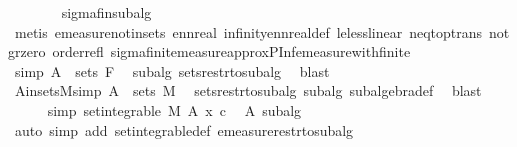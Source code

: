 \begin{isabellebody}
\ \ \ \ \ \ \isamarkupfalse%
\ sigma{\isacharunderscore}{\kern0pt}fin{\isacharunderscore}{\kern0pt}subalg\ \isamarkupfalse%
\ {\isacharparenleft}{\kern0pt}metis\ emeasure{\isacharunderscore}{\kern0pt}notin{\isacharunderscore}{\kern0pt}sets\ ennreal{\isacharunderscore}{\kern0pt}{}\ infinity{\isacharunderscore}{\kern0pt}ennreal{\isacharunderscore}{\kern0pt}def\ le{\isacharunderscore}{\kern0pt}less{\isacharunderscore}{\kern0pt}linear\ neq{\isacharunderscore}{\kern0pt}top{\isacharunderscore}{\kern0pt}trans\ not{\isacharunderscore}{\kern0pt}gr{\isacharunderscore}{\kern0pt}zero\ order{\isacharunderscore}{\kern0pt}refl\ sigma{\isacharunderscore}{\kern0pt}finite{\isacharunderscore}{\kern0pt}measure{\isachardot}{\kern0pt}approx{\isacharunderscore}{\kern0pt}PInf{\isacharunderscore}{\kern0pt}emeasure{\isacharunderscore}{\kern0pt}with{\isacharunderscore}{\kern0pt}finite{\isacharparenright}{\kern0pt}\isanewline
\ \ \ \ \isamarkupfalse%
\ {\isacharbrackleft}{\kern0pt}simp{\isacharbrackright}{\kern0pt}{\isacharcolon}{\kern0pt}\ {\isachardoublequoteopen}A\ {\isasymin}\ sets\ F{\isachardoublequoteclose}\ \isamarkupfalse%
\ subalg\ sets{\isacharunderscore}{\kern0pt}restr{\isacharunderscore}{\kern0pt}to{\isacharunderscore}{\kern0pt}subalg\ \isamarkupfalse%
\ blast\isanewline
\ \ \ \ \isamarkupfalse%
\ A{\isacharunderscore}{\kern0pt}in{\isacharunderscore}{\kern0pt}sets{\isacharunderscore}{\kern0pt}M{\isacharbrackleft}{\kern0pt}simp{\isacharbrackright}{\kern0pt}{\isacharcolon}{\kern0pt}\ {\isachardoublequoteopen}A\ {\isasymin}\ sets\ M{\isachardoublequoteclose}\ \isamarkupfalse%
\ sets{\isacharunderscore}{\kern0pt}restr{\isacharunderscore}{\kern0pt}to{\isacharunderscore}{\kern0pt}subalg\ subalg\ subalgebra{\isacharunderscore}{\kern0pt}def\ \isamarkupfalse%
\ blast\isanewline
\ \ \ \ \isamarkupfalse%
\ {\isacharbrackleft}{\kern0pt}simp{\isacharbrackright}{\kern0pt}{\isacharcolon}{\kern0pt}\ {\isachardoublequoteopen}set{\isacharunderscore}{\kern0pt}integrable\ M\ A\ {\isacharparenleft}{\kern0pt}{\isasymlambda}x{\isachardot}{\kern0pt}\ c{\isacharparenright}{\kern0pt}{\isachardoublequoteclose}\ \isamarkupfalse%
\ A\ subalg\ \isamarkupfalse%
\ {\isacharparenleft}{\kern0pt}auto\ simp\ add{\isacharcolon}{\kern0pt}\ set{\isacharunderscore}{\kern0pt}integrable{\isacharunderscore}{\kern0pt}def\ emeasure{\isacharunderscore}{\kern0pt}restr{\isacharunderscore}{\kern0pt}to{\isacharunderscore}{\kern0pt}subalg{\isacharparenright}{\kern0pt}\ \isanewline

\end{isabellebody}
